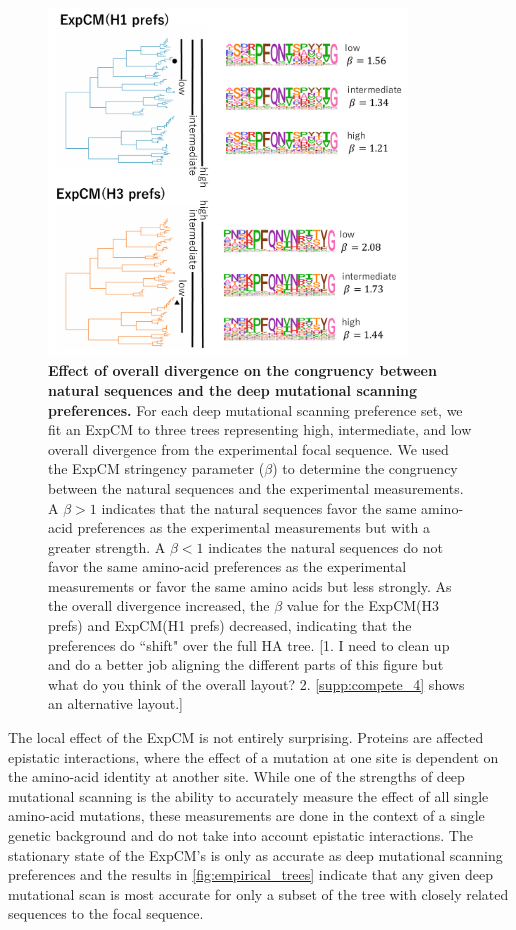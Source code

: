 \documentclass[11pt]{article}
\newcommand\skhcomment[1]{{\color{cyan}[#1]}}
\begin{document}
\begin{figure}
\centerline{\includegraphics[width=0.85\textwidth]{figures/compete_3}}
\caption{\label{fig:compete}
\textbf{Effect of overall divergence on the congruency between natural sequences and the deep mutational scanning preferences.} 
For each deep mutational scanning preference set, we fit an ExpCM to three trees representing high, intermediate, and low overall divergence from the experimental focal sequence. 
We used the ExpCM stringency parameter ($\beta$) to determine the congruency between the natural sequences and the experimental measurements. 
A $\beta >1$ indicates that the natural sequences favor the same amino-acid preferences as the experimental measurements but with a greater strength. 
A $\beta < 1$ indicates the natural sequences do not favor the same amino-acid preferences as the experimental measurements or favor the same amino acids but less strongly. 
As the overall divergence increased, the $\beta$ value for the ExpCM(H3 prefs) and ExpCM(H1 prefs) decreased, indicating that the preferences do ``shift" over the full HA tree. 
\skhcomment{1. I need to clean up and do a better job aligning the different parts of this figure but what do you think of the overall layout? 2. \ref{supp:compete_4} shows an alternative layout.}
}
\end{figure}

The local effect of the ExpCM is not entirely surprising. 
Proteins are affected epistatic interactions, where the effect of a mutation at one site is dependent on the amino-acid identity at another site. 
While one of the strengths of deep mutational scanning is the ability to accurately measure the effect of all single amino-acid mutations, these measurements are done in the context of a single genetic background and do not take into account epistatic interactions. 
The stationary state of the ExpCM's is only as accurate as deep mutational scanning preferences and the results in \ref{fig:empirical_trees} indicate that any given deep mutational scan is most accurate for only a subset of the tree with closely related sequences to the focal sequence.  
\end{document}
